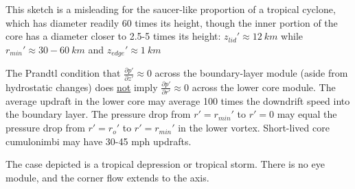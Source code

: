 \documentclass[preprint, prX]{revtex4}
\newcommand{\pd}[2]{\frac{\partial#1}{\partial#2}}
\newcommand{\rmin}{r_{min}}
\newcommand{\zedge}{z_{edge}}
\begin{document}
This sketch is a misleading for the saucer-like proportion of a tropical cyclone, which has diameter readily 60 times its height, though the inner portion of the core has a diameter closer to 2.5-5 times its height:
$z_{lid}' \approx 12\ \si{km}$ while $\rmin' \approx 30-60\ \si{km}$ and $\zedge' \approx 1\ \si{km}$

The Prandtl condition that $\pd{p'}{z'} \approx	0$ across the boundary-layer module (aside from hydrostatic changes) does \underline{not} imply $\pd{p'}{r'} \approx 0$ across the lower core module. The average updraft in the lower core may average 100 times the downdrift speed into the boundary layer. The pressure drop from $r'=\rmin'$ to $r'=0$ may equal the pressure drop from $r'=r_o'$ to $r'=\rmin'$ in the lower vortex. Short-lived core cumulonimbi may have 30-45 mph updrafts.

The case depicted is a tropical depression or tropical storm. There is no eye module, and the corner flow extends to the axis.
\end{document}
